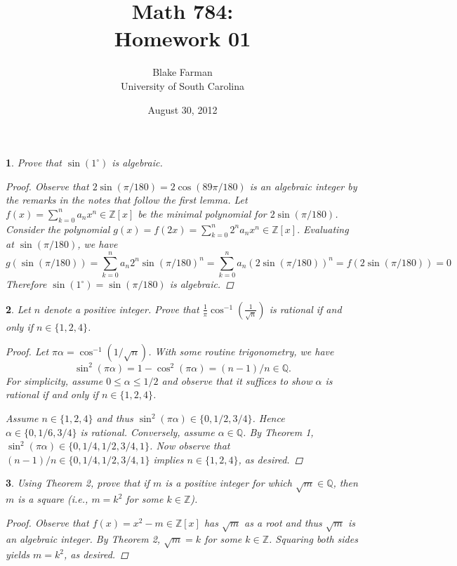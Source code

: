 \documentclass[10pt]{amsart}
\author{Blake Farman\\University of South Carolina}
\title{Math 784:\\Homework 01}
\date{August 30, 2012}
\begin{document}
\maketitle

\newtheorem{thm}{}

\begin{thm}
  Prove that $\sin(1^\circ)$ is algebraic.
  \begin{proof}
    Observe that $2\sin(\pi/180) = 2\cos(89\pi/180)$ is an algebraic integer by the remarks in the notes that follow the first lemma.
    Let $f(x) = \sum_{k=0}^n a_nx^n \in \mathbb{Z}[x]$ be the minimal polynomial for $2\sin(\pi/180)$.
    Consider the polynomial $g(x) = f(2x) = \sum_{k=0}^n 2^na_nx^n \in \mathbb{Z}[x].$  
    Evaluating at $\sin(\pi/180)$, we have 
    $$g(\sin(\pi/180)) = \sum_{k=0}^n a_n2^n\sin(\pi/180)^n = \sum_{k=0}^n a_n(2\sin(\pi/180))^n = f(2\sin(\pi/180)) = 0$$
    Therefore $\sin(1^\circ) = \sin(\pi/180)$ is algebraic.
  \end{proof}
\end{thm}

\begin{thm}
  Let $n$ denote a positive integer.  
  Prove that $\displaystyle{\frac{1}{\pi}\cos^{-1}\left(\frac{1}{\sqrt{n}}\right)}$ is rational if and only if $n \in \{1,2,4\}$.
  \begin{proof}
    Let $\pi\alpha = \cos^{-1}(1/\sqrt{n})$.
    With some routine trigonometry, we have 
    $$\sin^2(\pi\alpha) = 1 - \cos^2(\pi\alpha)= (n-1)/n \in \mathbb{Q}.$$
    For simplicity, assume $0 \leq \alpha \leq 1/2$ and observe that it suffices to show $\alpha$ is rational if and only if $n \in \{1,2,4\}$.
    
    Assume $n \in \{1,2,4\}$ and thus $\sin^2(\pi\alpha) \in \{0, 1/2, 3/4\}$.
    Hence $\alpha \in \{0, 1/6, 3/4\}$ is rational.  Conversely, assume $\alpha \in \mathbb{Q}$.
    By Theorem 1, $\sin^2(\pi\alpha) \in \{0,1/4,1/2,3/4,1\}$.
    Now observe that  $(n-1)/n \in \{0,1/4,1/2,3/4,1\}$ implies $n \in \{1,2,4\}$, as desired.
  \end{proof}
\end{thm}

\begin{thm}
  Using Theorem 2, prove that if $m$ is a positive integer for which $\sqrt{m} \in \mathbb{Q}$, then $m$ is a square (i.e., $m = k^2$ for some $k \in \mathbb{Z}$).
  \begin{proof}
    Observe that $f(x) = x^2 - m \in \mathbb{Z}[x]$ has $\sqrt{m}$ as a root and thus $\sqrt{m}$ is an algebraic integer.  
    By Theorem 2, $\sqrt{m} = k$ for some $k \in \mathbb{Z}$.
    Squaring both sides yields $m = k^2$, as desired.
  \end{proof}
\end{thm}
\end{document}
